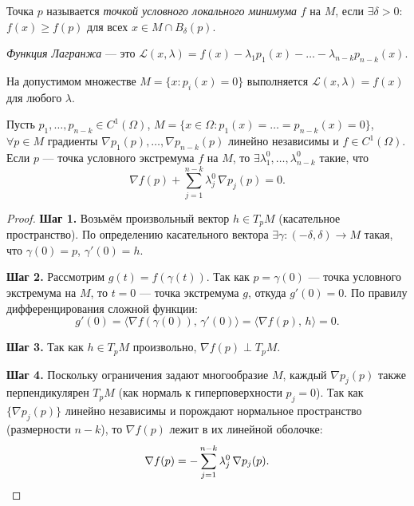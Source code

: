 


\begin{defn}
  Точка $p$ называется \emph{точкой условного локального минимума} $f$ на $M$, если
  $\exists\delta>0$: $f(x) \geq f(p)$ для всех $x \in M \cap B_\delta(p)$.
\end{defn}

\begin{defn}
  \emph{Функция Лагранжа} --- это $\mathcal{L}(x, \lambda) = f(x) - \lambda_1 p_1(x) - \ldots - \lambda_{n-k} p_{n-k}(x)$.

  На допустимом множестве $M = \{x: p_i(x) = 0\}$ выполняется
  $\mathcal{L}(x,\lambda) = f(x)$ для любого $\lambda$.
\end{defn}

\begin{theorem}
  Пусть $p_1,\ldots,p_{n-k} \in C^1(\Omega)$, $M = \{x\in\Omega: p_1(x)=\ldots=p_{n-k}(x)=0\}$,
  $\forall p \in M$ градиенты $\nabla p_1(p),\ldots,\nabla p_{n-k}(p)$ линейно независимы
  и $f \in C^1(\Omega)$. Если $p$ --- точка условного экстремума $f$ на $M$, то
  $\exists \lambda_1^0,\ldots,\lambda_{n-k}^0$ такие, что
  \[
    \nabla f(p) + \sum_{j=1}^{n-k} \lambda_j^0\,\nabla p_j(p) = 0.
  \]
  \begin{proof}
    \textbf{Шаг 1.} Возьмём произвольный вектор $h \in T_p M$ (касательное пространство).
    По определению касательного вектора $\exists \gamma: (-\delta,\delta) \to M$
    такая, что $\gamma(0) = p$, $\gamma'(0) = h$.

    \textbf{Шаг 2.} Рассмотрим $g(t) = f(\gamma(t))$.
    Так как $p = \gamma(0)$ --- точка условного экстремума на $M$, то $t=0$ --- точка экстремума $g$,
    откуда $g'(0) = 0$. По правилу дифференцирования сложной функции:
    \[
      g'(0) = \langle \nabla f(\gamma(0)),\, \gamma'(0) \rangle = \langle \nabla f(p),\, h \rangle = 0.
    \]

    \textbf{Шаг 3.} Так как $h \in T_p M$ произвольно, $\nabla f(p) \perp T_p M$.

    \textbf{Шаг 4.} Поскольку ограничения задают многообразие $M$, каждый $\nabla p_j(p)$
    также перпендикулярен $T_p M$ (как нормаль к гиперповерхности $p_j = 0$).
    Так как $\{\nabla p_j(p)\}$ линейно независимы и порождают нормальное пространство
    (размерности $n-k$), то $\nabla f(p)$ лежит в их линейной оболочке:
    \[
      \nabla f(p) = -\sum_{j=1}^{n-k} \lambda_j^0\,\nabla p_j(p). \qedhere
    \]
  \end{proof}
\end{theorem}

